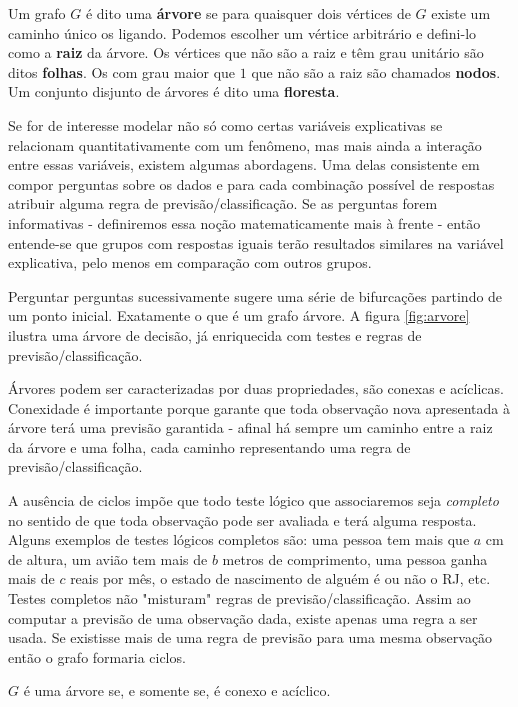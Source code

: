 \begin{defi}
Um grafo $G$ é dito uma \textbf{árvore} se para quaisquer dois vértices de $G$ existe um caminho único os ligando. Podemos escolher um vértice arbitrário e defini-lo como a \textbf{raiz} da árvore. Os vértices que não são a raiz e têm grau unitário são ditos \textbf{folhas}. Os com grau maior que $1$ que não são a raiz são chamados \textbf{nodos}. Um conjunto disjunto de árvores é dito uma \textbf{floresta}.
\end{defi}

Se for de interesse modelar não só como certas variáveis explicativas se relacionam quantitativamente com um fenômeno, mas mais ainda a interação entre essas variáveis, existem algumas abordagens. Uma delas consistente em compor perguntas sobre os dados e para cada combinação possível de respostas atribuir alguma regra de previsão/classificação. Se as perguntas forem informativas - definiremos essa noção matematicamente mais à frente - então entende-se que grupos com respostas iguais terão resultados similares na variável explicativa, pelo menos em comparação com outros grupos. 

Perguntar perguntas sucessivamente sugere uma série de bifurcações partindo de um ponto inicial. Exatamente o que é um grafo árvore. A figura \ref{fig:arvore} ilustra uma árvore de decisão, já enriquecida com testes e regras de previsão/classificação. 

Árvores podem ser caracterizadas por duas propriedades, são conexas e acíclicas. Conexidade é importante porque garante que toda observação nova apresentada à árvore terá uma previsão garantida - afinal há sempre um caminho entre a raiz da árvore e uma folha, cada caminho representando uma regra de previsão/classificação.

A ausência de ciclos impõe que todo teste lógico que associaremos seja \textit{completo} no sentido de que toda observação pode ser avaliada e terá alguma resposta. Alguns exemplos de testes lógicos completos são: uma pessoa tem mais que $a$ cm de altura, um avião tem mais de $b$ metros de comprimento, uma pessoa ganha mais de $c$ reais por mês, o estado de nascimento de alguém é ou não o RJ, etc. Testes completos não "misturam" regras de previsão/classificação. Assim ao computar a previsão de uma observação dada, existe apenas uma regra a ser usada. Se existisse mais de uma regra de previsão para uma mesma observação então o grafo formaria ciclos. 

\begin{teo}
$G$ é uma árvore se, e somente se, é conexo e acíclico.
\end{teo}

